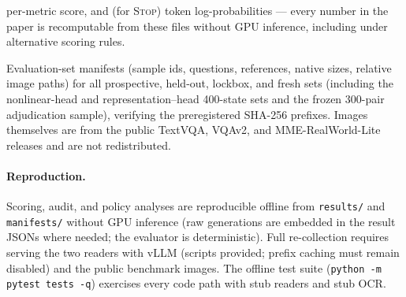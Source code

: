 \documentclass[10pt]{article}
\begin{document}
\begin{description}[style=nextline]
  per-metric score, and (for \textsc{Stop}) token log-probabilities ---
  every number in the paper is recomputable from these files without GPU
  inference, including under alternative scoring rules.
\item[\texttt{manifests/}] Evaluation-set manifests (sample ids,
  questions, references, native sizes, relative image paths) for all
  prospective, held-out, lockbox, and fresh sets (including the
  nonlinear-head and representation--head 400-state sets and the frozen
  300-pair adjudication sample), verifying the preregistered SHA-256
  prefixes. Images themselves are from the public
  TextVQA, VQAv2, and MME-RealWorld-Lite releases and are not
  redistributed.
\end{description}

\paragraph{Reproduction.}
Scoring, audit, and policy analyses are reproducible offline from
\texttt{results/} and \texttt{manifests/} without GPU inference (raw
generations are embedded in the result JSONs where needed; the evaluator
is deterministic). Full re-collection requires serving the two readers
with vLLM (scripts provided; prefix caching must remain disabled) and the
public benchmark images. The offline test suite
(\texttt{python -m pytest tests -q}) exercises every code path with stub
readers and stub OCR.
\end{document}

